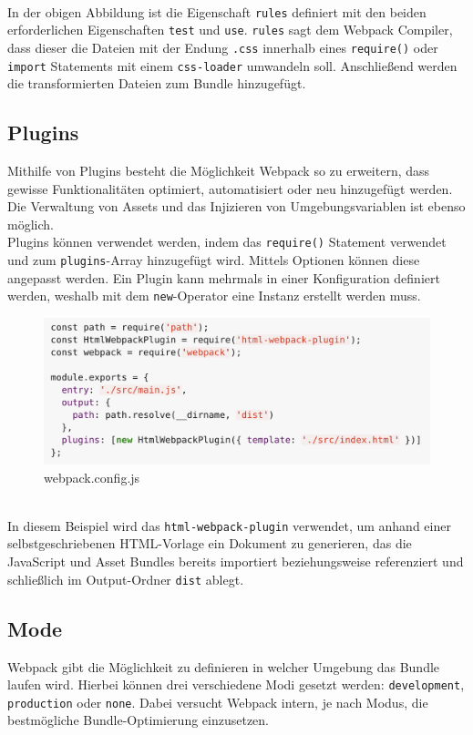 \mbox{}\\
In der obigen Abbildung ist die Eigenschaft \texttt{rules} definiert mit den beiden erforderlichen Eigenschaften \texttt{test} und \texttt{use}. \texttt{rules} sagt dem Webpack Compiler, dass dieser die Dateien mit der Endung \texttt{.css} innerhalb eines \texttt{require()} oder \texttt{import} Statements mit einem \texttt{css-loader} umwandeln soll. Anschließend werden die transformierten Dateien zum Bundle hinzugefügt.

\subsection{Plugins}
Mithilfe von Plugins besteht die Möglichkeit Webpack so zu erweitern, dass gewisse Funktionalitäten optimiert, automatisiert oder neu hinzugefügt werden. Die Verwaltung von Assets und das Injizieren von Umgebungsvariablen ist ebenso möglich. 
\mbox{}\\
Plugins können verwendet werden, indem das \texttt{require()} Statement verwendet und zum \texttt{plugins}-Array hinzugefügt wird. Mittels Optionen können diese angepasst werden. Ein Plugin kann mehrmals in einer Konfiguration definiert werden, weshalb mit dem \texttt{new}-Operator eine Instanz erstellt werden muss.

\begin{figure}[H]
	\begin{center}
		\includegraphics[scale=.7]{images/webpack-plugins.png}
	\end{center}
		\caption{webpack.config.js}
\end{figure}

\mbox{}\\
In diesem Beispiel wird das \texttt{html-webpack-plugin} verwendet, um anhand einer selbstgeschriebenen HTML-Vorlage ein Dokument zu generieren, das die JavaScript und Asset Bundles bereits importiert beziehungsweise referenziert und schließlich  im Output-Ordner \texttt{dist} ablegt.

\subsection{Mode}
Webpack gibt die Möglichkeit zu definieren in welcher Umgebung das Bundle laufen wird. Hierbei können drei verschiedene Modi gesetzt werden: \texttt{development}, \texttt{production} oder \texttt{none}. Dabei versucht Webpack intern, je nach Modus, die bestmögliche Bundle-Optimierung einzusetzen.

